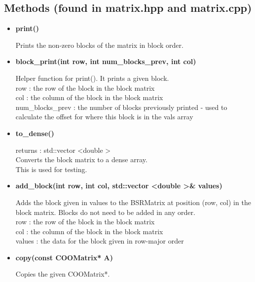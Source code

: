 \documentclass{article}
\newcommand\tab[1][1cm]{\hspace*{#1}}
\begin{document}
\subsection*{Methods (found in matrix.hpp and matrix.cpp)}
    \begin{itemize}
        \item \textbf{print()}
        
            Prints the non-zero blocks of the matrix in block order.
        
        \item \textbf{block\_print(int row, int num\_blocks\_prev, int col)}
        
            Helper function for print(). It prints a given block. \\
            row : the row of the block in the block matrix \\
            col : the column of the block in the block matrix \\
            num\_blocks\_prev : the number of blocks previously printed - used to \\
                \tab calculate the offset for where this block is in the vals array
        
        \item \textbf{to\_dense()}
        
            returns : std::vector \textless double \textgreater \\
            Converts the block matrix to a dense array. \\
            This is used for testing.
        
        \item \textbf{add\_block(int row, int col, 
            std::vector \textless double \textgreater\& values)}
        
            Adds the block given in values to the BSRMatrix at position (row, col)
            in the block matrix. Blocks do not need to be added in any order.\\
            row : the row of the block in the block matrix \\
            col : the column of the block in the block matrix \\
            values : the data for the block given in row-major order
        
        \item \textbf{copy(const COOMatrix* A)}
        
            Copies the given COOMatrix*. 
        

\end{itemize}
\end{document}
